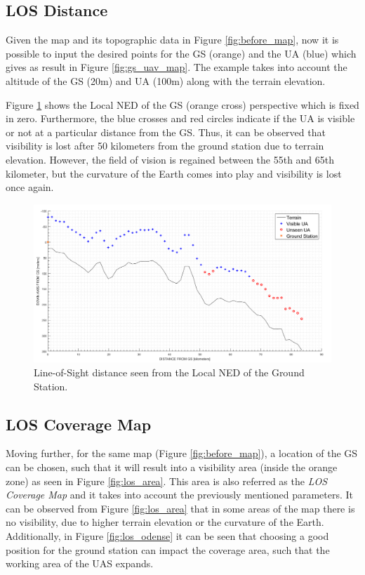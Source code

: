 \subsection*{LOS Distance}
Given the map and its topographic data in Figure \ref{fig:before_map}, now it is possible to input the desired points for the GS (orange) and the UA (blue) which gives as result in Figure \ref{fig:gs_uav_map}. The example takes into account the altitude of the GS (20m) and UA (100m) along with the terrain elevation. 

Figure \ref{fig:los_2p} shows the Local NED of the GS (orange cross) perspective which is fixed in zero. Furthermore, the blue crosses and red circles indicate if the UA is visible or not at a particular distance from the GS. Thus, it can be observed that visibility is lost after 50 kilometers from the ground station due to terrain elevation. However, the field of vision is regained between the 55th and 65th kilometer, but the curvature of the Earth comes into play and visibility is lost once again.

\begin{figure}[H]
	\centering
	\includegraphics[scale=0.40]{figures/los_2points.png}
	\caption{Line-of-Sight distance seen from the Local NED of the Ground Station.}
   	\label{fig:los_2p}
\end{figure}

\subsection*{LOS Coverage Map}
Moving further, for the same map (Figure \ref{fig:before_map}), a location of the GS can be chosen, such that it will result into a visibility area (inside the orange zone) as seen in Figure \ref{fig:los_area}. This area is also referred as the \emph{LOS Coverage Map} and it takes into account the previously mentioned parameters.
It can be observed from Figure \ref{fig:los_area} that in some areas of the map there is no visibility, due to higher terrain elevation or the curvature of the Earth. Additionally, in Figure \ref{fig:los_odense} it can be seen that choosing a good position for the ground station can impact the coverage area, such that the working area of the UAS expands. 

